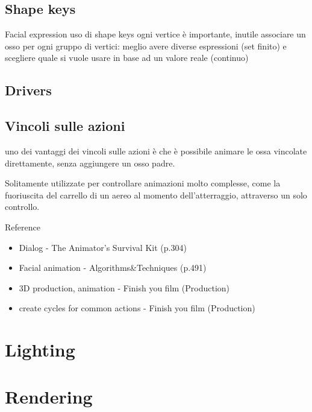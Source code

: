 \subsection{Shape keys}
Facial expression
uso di shape keys
ogni vertice è importante, inutile associare un osso per ogni gruppo di vertici: meglio avere diverse espressioni (set finito) e scegliere quale si vuole usare in base ad un valore reale (continuo)
\subsection{Drivers}
\subsection{Vincoli sulle azioni}
uno dei vantaggi dei vincoli sulle azioni è che è possibile animare le ossa vincolate direttamente, senza aggiungere un osso padre.

Solitamente utilizzate per controllare animazioni molto complesse, come la fuoriuscita del carrello di un aereo al momento dell'atterraggio, attraverso un solo controllo.

Reference
\begin{itemize}
    \item Dialog - The Animator's Survival Kit (p.304) 
    \item Facial animation - Algorithms\&Techniques (p.491)
    \item 3D production, animation - Finish you film (Production)
        \item create cycles for common actions - Finish you film (Production)
\end{itemize}
\section{Lighting}
\section{Rendering}


